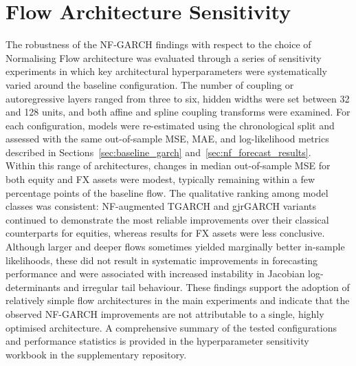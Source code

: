 \documentclass[oneside,12pt]{CUEDthesisPSnPDF}
\begin{document}

\section{Flow Architecture Sensitivity}
\label{sec:flow_sensitivity}
\noindent
The robustness of the NF-GARCH findings with respect to the choice of Normalising Flow architecture was evaluated through a series of sensitivity experiments in which key architectural hyperparameters were systematically varied around the baseline configuration. The number of coupling or autoregressive layers ranged from three to six, hidden widths were set between 32 and 128 units, and both affine and spline coupling transforms were examined. For each configuration, models were re-estimated using the chronological split and assessed with the same out-of-sample MSE, MAE, and log-likelihood metrics described in Sections~\ref{sec:baseline_garch} and~\ref{sec:nf_forecast_results}.\\

Within this range of architectures, changes in median out-of-sample MSE for both equity and FX assets were modest, typically remaining within a few percentage points of the baseline flow. The qualitative ranking among model classes was consistent: NF-augmented TGARCH and gjrGARCH variants continued to demonstrate the most reliable improvements over their classical counterparts for equities, whereas results for FX assets were less conclusive. Although larger and deeper flows sometimes yielded marginally better in-sample likelihoods, these did not result in systematic improvements in forecasting performance and were associated with increased instability in Jacobian log-determinants and irregular tail behaviour. These findings support the adoption of relatively simple flow architectures in the main experiments and indicate that the observed NF-GARCH improvements are not attributable to a single, highly optimised architecture. A comprehensive summary of the tested configurations and performance statistics is provided in the hyperparameter sensitivity workbook in the supplementary repository.\\

\end{document}
